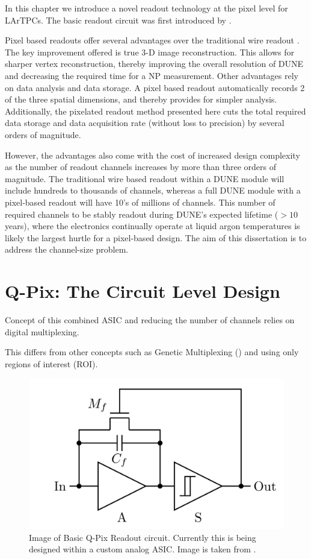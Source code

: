 In this chapter we introduce a novel readout technology at the pixel level for LArTPCs. 
The basic readout circuit was first introduced by \citep{qpix:nygren:mei}.

Pixel based readouts offer several advantages over the traditional wire readout \citep{lartpc_recon_problems_joshi_2015}.
The key improvement offered is true 3-D image reconstruction. 
This allows for sharper vertex reconstruction, thereby improving the overall resolution of DUNE and decreasing the required time for a NP measurement.
Other advantages rely on data analysis and data storage. 
A pixel based readout automatically records 2 of the three spatial dimensions, and thereby provides for simpler analysis.
Additionally, the pixelated readout method presented here cuts the total required data storage and data acquisition rate (without loss to precision) by several orders of magnitude.

However, the advantages also come with the cost of increased design complexity as the number of readout channels increases by more than three orders of magnitude. 
The traditional wire based readout within a DUNE module will include hundreds to thousands of channels, whereas a full DUNE module with a pixel-based readout will have 10's of millions of channels.
This number of required channels to be stably readout during DUNE's expected lifetime ($> 10$ years), where the electronics continually operate at liquid argon temperatures is likely the largest hurtle for a pixel-based design.
The aim of this dissertation is to address the channel-size problem.

\section{Q-Pix: The Circuit Level Design}

Concept of this combined ASIC and reducing the number of channels relies on digital multiplexing.

This differs from other concepts such as Genetic Multiplexing (\citep{PROCUREUR2013888_genetic_multiplexing}) and using only regions of interest (ROI).

\begin{figure}[ht!]
\centering
\includegraphics[width=\textwidth]{images/qpix_circuit.jpg}
\caption{Image of Basic Q-Pix Readout circuit. Currently this is being designed within a custom analog ASIC. Image is taken from \citep{qpix:nygren:mei}.}
\end{figure}


